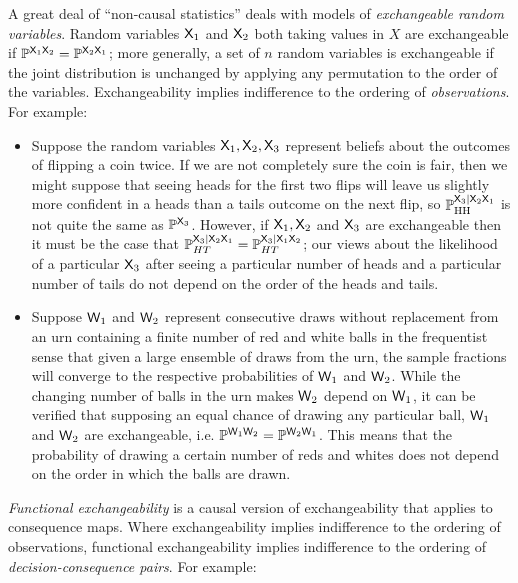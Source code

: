 A great deal of ``non-causal statistics'' deals with models of \emph{exchangeable random variables}. Random variables $\mathsf{X}_1$ and $\mathsf{X}_2$ both taking values in $X$ are exchangeable if $\mathbb{P}^{\mathsf{X}_1\mathsf{X}_2} = \mathbb{P}^{\mathsf{X}_2\mathsf{X}_1}$; more generally, a set of $n$ random variables is exchangeable if the joint distribution is unchanged by applying any permutation to the order of the variables. Exchangeability implies indifference to the ordering of \emph{observations}. For example:
\begin{itemize}
    \item Suppose the random variables $\mathsf{X}_1, \mathsf{X}_2, \mathsf{X}_3$ represent beliefs about the outcomes of flipping a coin twice. If we are not completely sure the coin is fair, then we might suppose that seeing heads for the first two flips will leave us slightly more confident in a heads than a tails outcome on the next flip, so $\mathbb{P}^{\mathsf{X}_3|\mathsf{X}_2\mathsf{X}_1}_{\text{HH}}$ is not quite the same as $\mathbb{P}^{\mathsf{X}_3}$. However, if $\mathsf{X}_1,\mathsf{X}_2$ and $\mathsf{X}_3$ are exchangeable then it must be the case that $\mathbb{P}^{\mathsf{X}_3|\mathsf{X}_2\mathsf{X}_1}_{HT}=\mathbb{P}^{\mathsf{X}_3|\mathsf{X}_1\mathsf{X}_2}_{HT}$; our views about the likelihood of a particular $\mathsf{X}_3$ after seeing a particular number of heads and a particular number of tails do not depend on the order of the heads and tails.
    \item Suppose $\mathsf{W}_1$ and $\mathsf{W}_2$ represent consecutive draws without replacement from an urn containing a finite number of red and white balls in the frequentist sense that given a large ensemble of draws from the urn, the sample fractions will converge to the respective probabilities of $\mathsf{W}_1$ and $\mathsf{W}_2$. While the changing number of balls in the urn makes $\mathsf{W}_2$ depend on $\mathsf{W}_1$, it can be verified that supposing an equal chance of drawing any particular ball, $\mathsf{W}_1$ and $\mathsf{W}_2$ are exchangeable, i.e. $\mathbb{P}^{\mathsf{W}_1\mathsf{W}_2}=\mathbb{P}^{\mathsf{W}_2\mathsf{W}_1}$. This means that the probability of drawing a certain number of reds and whites does not depend on the order in which the balls are drawn.
\end{itemize}

\emph{Functional exchangeability} is a causal version of exchangeability that applies to consequence maps. Where exchangeability implies indifference to the ordering of observations, functional exchangeability implies indifference to the ordering of \emph{decision-consequence pairs}. For example:

